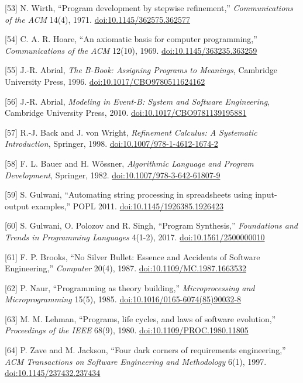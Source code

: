 \documentclass[10pt,letterpaper]{article}
\begin{document}
{[}53{]} N. Wirth, ``Program development by stepwise refinement,''
\emph{Communications of the ACM} 14(4), 1971.
\href{https://doi.org/10.1145/362575.362577}{doi:10.1145/362575.362577}

{[}54{]} C. A. R. Hoare, ``An axiomatic basis for computer
programming,'' \emph{Communications of the ACM} 12(10), 1969.
\href{https://doi.org/10.1145/363235.363259}{doi:10.1145/363235.363259}

{[}55{]} J.-R. Abrial, \emph{The B-Book: Assigning Programs to
Meanings}, Cambridge University Press, 1996.
\href{https://doi.org/10.1017/CBO9780511624162}{doi:10.1017/CBO9780511624162}

{[}56{]} J.-R. Abrial, \emph{Modeling in Event-B: System and Software
Engineering}, Cambridge University Press, 2010.
\href{https://doi.org/10.1017/CBO9781139195881}{doi:10.1017/CBO9781139195881}

{[}57{]} R.-J. Back and J. von Wright, \emph{Refinement Calculus: A
Systematic Introduction}, Springer, 1998.
\href{https://doi.org/10.1007/978-1-4612-1674-2}{doi:10.1007/978-1-4612-1674-2}

{[}58{]} F. L. Bauer and H. Wössner, \emph{Algorithmic Language and
Program Development}, Springer, 1982.
\href{https://doi.org/10.1007/978-3-642-61807-9}{doi:10.1007/978-3-642-61807-9}

{[}59{]} S. Gulwani, ``Automating string processing in spreadsheets
using input-output examples,'' POPL 2011.
\href{https://doi.org/10.1145/1926385.1926423}{doi:10.1145/1926385.1926423}

{[}60{]} S. Gulwani, O. Polozov and R. Singh, ``Program Synthesis,''
\emph{Foundations and Trends in Programming Languages} 4(1-2), 2017.
\href{https://doi.org/10.1561/2500000010}{doi:10.1561/2500000010}

{[}61{]} F. P. Brooks, ``No Silver Bullet: Essence and Accidents of
Software Engineering,'' \emph{Computer} 20(4), 1987.
\href{https://doi.org/10.1109/MC.1987.1663532}{doi:10.1109/MC.1987.1663532}

{[}62{]} P. Naur, ``Programming as theory building,''
\emph{Microprocessing and Microprogramming} 15(5), 1985.
\href{https://doi.org/10.1016/0165-6074(85)90032-8}{doi:10.1016/0165-6074(85)90032-8}

{[}63{]} M. M. Lehman, ``Programs, life cycles, and laws of software
evolution,'' \emph{Proceedings of the IEEE} 68(9), 1980.
\href{https://doi.org/10.1109/PROC.1980.11805}{doi:10.1109/PROC.1980.11805}

{[}64{]} P. Zave and M. Jackson, ``Four dark corners of requirements
engineering,'' \emph{ACM Transactions on Software Engineering and
Methodology} 6(1), 1997.
\href{https://doi.org/10.1145/237432.237434}{doi:10.1145/237432.237434}
\end{document}
